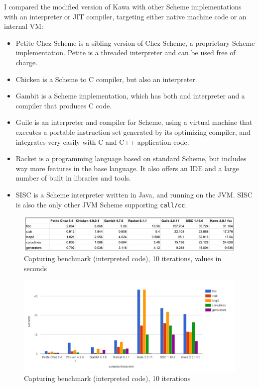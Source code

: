 \documentclass[12pt,a4paper,oneside,openright]{book}
\begin{document}
I compared the modified version of Kawa with other Scheme
implementations with an interpreter or JIT compiler, targeting either
native machine code or an internal VM:

\begin{itemize}
\item
  Petite Chez Scheme is a sibling version of Chez Scheme, a proprietary
  Scheme implementation. Petite is a threaded interpreter and can be
  used free of charge.
\item
  Chicken is a Scheme to C compiler, but also an interpreter.
\item
  Gambit is a Scheme implementation, which has both and interpreter and
  a compiler that produces C code.
\item
  Guile is an interpreter and compiler for Scheme, using a virtual
  machine that executes a portable instruction set generated by its
  optimizing compiler, and integrates very easily with C and C++
  application code.
\item
  Racket is a programming language based on standard Scheme, but
  includes way more features in the base language. It also offers an IDE
  and a large number of built in libraries and tools.
\item
  SISC is a Scheme interpreter written in Java, and running on the JVM.
  SISC is also the only other JVM Scheme supporting \texttt{call/cc}.
\end{itemize}

\begin{figure}[htbp]
\centering
\includegraphics{figures/interpreted-table.pdf}
\caption{Capturing benchmark (interpreted code), 10 iterations, values
in seconds \label{interp-tab}}
\end{figure}

\begin{figure}[htbp]
\centering
\includegraphics{figures/interpreted.png}
\caption{Capturing benchmark (interpreted code), 10 iterations
\label{interp}}
\end{figure}
\end{document}
